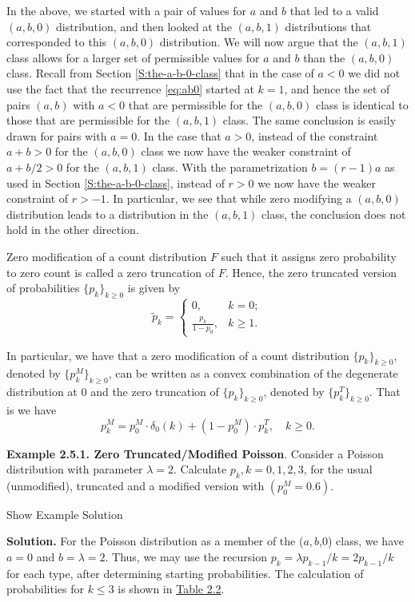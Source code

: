 \documentclass[]{book}
\theoremstyle{definition}
\theoremstyle{definition}
\theoremstyle{definition}
\theoremstyle{remark}
\begin{document}
In the above, we started with a pair of values for \(a\) and \(b\) that
led to a valid \((a,b,0)\) distribution, and then looked at the
\((a,b,1)\) distributions that corresponded to this \((a,b,0)\)
distribution. We will now argue that the \((a,b,1)\) class allows for a
larger set of permissible values for \(a\) and \(b\) than the
\((a,b,0)\) class. Recall from Section \ref{S:the-a-b-0-class} that in
the case of \(a<0\) we did not use the fact that the recurrence
\eqref{eq:ab0} started at \(k=1\), and hence the set of pairs \((a,b)\)
with \(a<0\) that are permissible for the \((a,b,0)\) class is identical
to those that are permissible for the \((a,b,1)\) class. The same
conclusion is easily drawn for pairs with \(a=0\). In the case that
\(a>0\), instead of the constraint \(a+b>0\) for the \((a,b,0)\) class
we now have the weaker constraint of \(a+b/2>0\) for the \((a,b,1)\)
class. With the parametrization \(b=(r-1)a\) as used in Section
\ref{S:the-a-b-0-class}, instead of \(r>0\) we now have the weaker
constraint of \(r>-1\). In particular, we see that while zero modifying
a \((a,b,0)\) distribution leads to a distribution in the \((a,b,1)\)
class, the conclusion does not hold in the other direction.

Zero modification of a count distribution \(F\) such that it assigns
zero probability to zero count is called a zero truncation of \(F\).
Hence, the zero truncated version of probabilities \(\{p_k\}_{k\geq 0}\)
is given by \[
\tilde{p}_k=\begin{cases}
0, & k=0;\\
\frac{p_k}{1-p_0}, & k\geq 1.
\end{cases}
\]

In particular, we have that a zero modification of a count distribution
\(\{p_k\}_{k\geq 0}\), denoted by \(\{p^M_k\}_{k\geq 0}\), can be
written as a convex combination of the degenerate distribution at \(0\)
and the zero truncation of \(\{p_k\}_{k\geq 0}\), denoted by
\(\{p^T_k\}_{k\geq 0}\). That is we have \[
p^M_k= p^M_0 \cdot \delta_{0}(k) + (1-p^M_0) \cdot p^T_k, \quad k\geq 0.  
\]

\textbf{Example 2.5.1. Zero Truncated/Modified Poisson}. Consider a
Poisson distribution with parameter \(\lambda=2\). Calculate
\(p_k, k=0,1,2,3\), for the usual (unmodified), truncated and a modified
version with \((p_0^M=0.6)\).

Show Example Solution

\hypertarget{toggleExampleFreq.5.1}{}
\textbf{Solution.} For the Poisson distribution as a member of the
(\(a,b\),0) class, we have \(a=0\) and \(b=\lambda=2\). Thus, we may use
the recursion \(p_k = \lambda p_{k-1}/k= 2 p_{k-1}/k\) for each type,
after determining starting probabilities. The calculation of
probabilities for \(k\leq 3\) is shown in
\protect\hyperlink{tab:2.2}{Table 2.2}.
\end{document}
